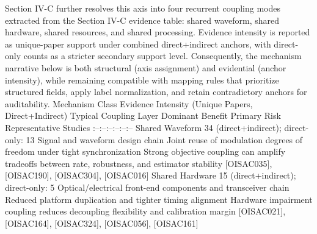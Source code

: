 {}Section IV-C further resolves this axis into four recurrent coupling modes extracted from the Section IV-C evidence table: shared waveform, shared hardware, shared resources, and shared processing. Evidence intensity is reported as unique-paper support under combined direct+indirect anchors, with direct-only counts as a stricter secondary support level. Consequently, the mechanism narrative below is both structural (axis assignment) and evidential (anchor intensity), while remaining compatible with mapping rules that prioritize structured fields, apply label normalization, and retain contradictory anchors for auditability.\markdownRendererParagraphSeparator
{}\markdownRendererParagraphSeparator
{}\markdownRendererPipe{} Mechanism Class \markdownRendererPipe{} Evidence Intensity (Unique Papers, Direct+Indirect) \markdownRendererPipe{} Typical Coupling Layer \markdownRendererPipe{} Dominant Benefit \markdownRendererPipe{} Primary Risk \markdownRendererPipe{} Representative Studies \markdownRendererPipe{}\markdownRendererSoftLineBreak
{}\markdownRendererPipe{}:--\markdownRendererPipe{}:--\markdownRendererPipe{}:--\markdownRendererPipe{}:--\markdownRendererPipe{}:--\markdownRendererPipe{}:--\markdownRendererPipe{}\markdownRendererSoftLineBreak
{}\markdownRendererPipe{} Shared Waveform \markdownRendererPipe{} 34 (direct+indirect); direct-only: 13 \markdownRendererPipe{} Signal and waveform design chain \markdownRendererPipe{} Joint reuse of modulation degrees of freedom under tight synchronization \markdownRendererPipe{} Strong objective coupling can amplify tradeoffs between rate, robustness, and estimator stability \markdownRendererPipe{} [O\markdownRendererUnderscore{}ISAC\markdownRendererUnderscore{}035], [O\markdownRendererUnderscore{}ISAC\markdownRendererUnderscore{}190], [O\markdownRendererUnderscore{}ISAC\markdownRendererUnderscore{}304], [O\markdownRendererUnderscore{}ISAC\markdownRendererUnderscore{}016] \markdownRendererPipe{}\markdownRendererSoftLineBreak
{}\markdownRendererPipe{} Shared Hardware \markdownRendererPipe{} 15 (direct+indirect); direct-only: 5 \markdownRendererPipe{} Optical/electrical front-end components and transceiver chain \markdownRendererPipe{} Reduced platform duplication and tighter timing alignment \markdownRendererPipe{} Hardware impairment coupling reduces decoupling flexibility and calibration margin \markdownRendererPipe{} [O\markdownRendererUnderscore{}ISAC\markdownRendererUnderscore{}021], [O\markdownRendererUnderscore{}ISAC\markdownRendererUnderscore{}164], [O\markdownRendererUnderscore{}ISAC\markdownRendererUnderscore{}324], [O\markdownRendererUnderscore{}ISAC\markdownRendererUnderscore{}056], [O\markdownRendererUnderscore{}ISAC\markdownRendererUnderscore{}161] \markdownRendererPipe{}\markdownRendererSoftLineBreak
